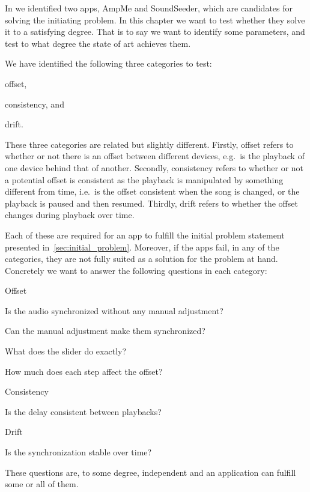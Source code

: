 In  we identified two apps, AmpMe and SoundSeeder, which are candidates for solving the initiating problem.
In this chapter we want to test whether they solve it to a satisfying degree.
That is to say we want to identify some parameters, and test to what degree the state of art achieves them.

We have identified the following three categories to test:
\begin{eletterate*}
    \item offset,
    \item consistency, and
    \item drift.
\end{eletterate*}

These three categories are related but slightly different.
Firstly, offset refers to whether or not there is an offset between different devices, e.g.\ is the playback of one device behind that of another.
Secondly, consistency refers to whether or not a potential offset is consistent as the playback is manipulated by something different from time, i.e.\ is the offset consistent when the song is changed, or the playback is paused and then resumed.
Thirdly, drift refers to whether the offset changes during playback over time.

Each of these are required for an app to fulfill the initial problem statement presented in~\cref{sec:initial_problem}.
Moreover, if the apps fail, in any of the categories, they are not fully suited as a solution for the problem at hand.
Concretely we want to answer the following questions in each category:
\begin{eletterate}
    \item Offset
    \begin{enumberate}
        \item Is the audio synchronized without any manual adjustment?
        \item Can the manual adjustment make them synchronized?
        \begin{enumberate}
            \item What does the slider do exactly?
            \item How much does each step affect the offset?
        \end{enumberate}
    \end{enumberate}
    \item Consistency
    \begin{enumberate}[resume]
        \item Is the delay consistent between playbacks?
    \end{enumberate}
    \item Drift
    \begin{enumberate}[resume]
        \item Is the synchronization stable over time?
    \end{enumberate}
\end{eletterate}

These questions are, to some degree, independent and an application can fulfill some or all of them.

